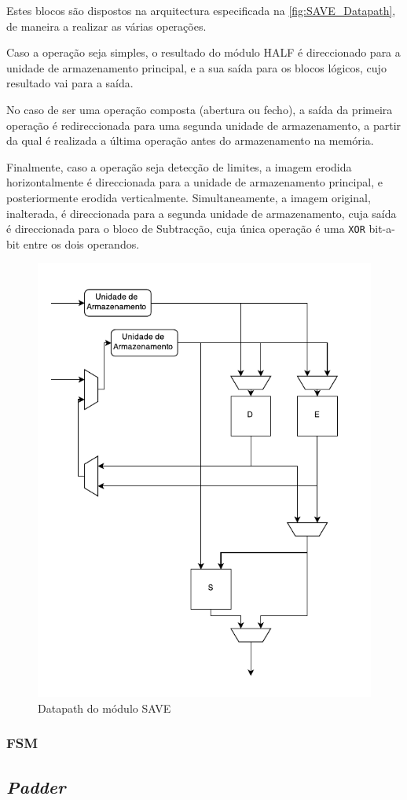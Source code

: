\documentclass[a4paper]{article}
\begin{document}
Estes blocos são dispostos na arquitectura especificada na \autoref{fig:SAVE_Datapath}, de maneira a realizar as várias operações.

Caso a operação seja simples, o resultado do módulo HALF é direccionado para a unidade de armazenamento principal, e a sua saída para os blocos lógicos, cujo resultado vai para a saída.

No caso de ser uma operação composta (abertura ou fecho), a saída da primeira operação é redireccionada para uma segunda unidade de armazenamento, a partir da qual é realizada a última operação antes do armazenamento na memória.

Finalmente, caso a operação seja detecção de limites, a imagem erodida horizontalmente é direccionada para a unidade de armazenamento principal, e posteriormente erodida verticalmente. Simultaneamente, a imagem original, inalterada, é direccionada para a segunda unidade de armazenamento, cuja saída é direccionada para o bloco de Subtracção, cuja única operação é uma \texttt{XOR} bit-a-bit entre os dois operandos.

\begin{figure}[h]
	\centering
	\includegraphics[width=0.6\linewidth]{SAVE_Datapath}
	\caption{Datapath do módulo SAVE}
	\label{fig:SAVE_Datapath}
\end{figure}

\subsubsection{FSM}

\subsection{\textit{Padder}}
\end{document}
